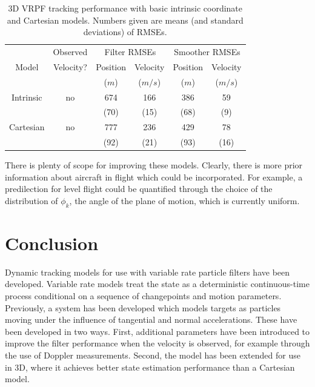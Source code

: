 \documentclass[conference]{IEEEtran}
\begin{document}
\begin{table}
\renewcommand{\arraystretch}{1.3}
\caption{3D VRPF tracking performance with basic intrinsic coordinate and Cartesian models. Numbers given are means (and standard deviations) of RMSEs.}
\label{tab:3D_performance}
\centering
\begin{tabular}{|c|c|c|c|c|c|}
\hline
      & Observed  & \multicolumn{2}{c|}{Filter RMSEs}  & \multicolumn{2}{c|}{Smoother RMSEs}  \\
Model & Velocity? & Position & Velocity                & Position & Velocity                  \\
      &           & ($m$)    & ($m/s$)                 & ($m$)    & ($m/s$)                   \\
\hline
Intrinsic & no  & 674 & 166 & 386 & 59 \\
          &     &(70) &(15) &(68) &(9) \\
\hline
Cartesian & no  & 777 & 236 & 429 & 78 \\
          &     &(92) &(21) &(93) &(16) \\
\hline
\end{tabular}
\end{table}
%
There is plenty of scope for improving these models. Clearly, there is more prior information about aircraft in flight which could be incorporated. For example, a predilection for level flight could be quantified through the choice of the distribution of $\phi_k$, the angle of the plane of motion, which is currently uniform.



\section{Conclusion}

Dynamic tracking models for use with variable rate particle filters have been developed. Variable rate models treat the state as a deterministic continuous-time process conditional on a sequence of changepoints and motion parameters. Previously, a system has been developed which models targets as particles moving under the influence of tangential and normal accelerations. These have been developed in two ways. First, additional parameters have been introduced to improve the filter performance when the velocity is observed, for example through the use of Doppler measurements. Second, the model has been extended for use in 3D, where it achieves better state estimation performance than a Cartesian model.





\end{document}
